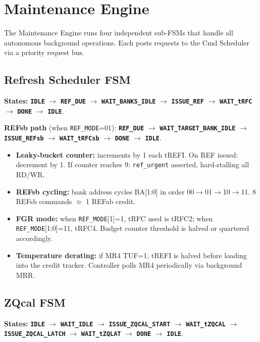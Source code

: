 \documentclass[11pt,a4paper]{article}
\newcommand{\reg}[1]{\textcolor{ddrpurple}{\texttt{#1}}}
\newcommand{\sig}[1]{\textcolor{ddrteal}{\texttt{#1}}}
\newcommand{\state}[1]{\textcolor{ddrblue}{\textbf{\texttt{#1}}}}
\begin{document}
\section{Maintenance Engine}

The Maintenance Engine runs four independent sub-FSMs that handle all
autonomous background operations. Each posts requests to the Cmd Scheduler
via a priority request bus.

\subsection{Refresh Scheduler FSM}

\textbf{States:} \state{IDLE} $\to$ \state{REF\_DUE} $\to$ \state{WAIT\_BANKS\_IDLE}
$\to$ \state{ISSUE\_REF} $\to$ \state{WAIT\_tRFC} $\to$ \state{DONE} $\to$
\state{IDLE}.

\textbf{REFsb path} (when \reg{REF\_MODE}=01): \state{REF\_DUE} $\to$
\state{WAIT\_TARGET\_BANK\_IDLE} $\to$ \state{ISSUE\_REFsb} $\to$
\state{WAIT\_tRFCsb} $\to$ \state{DONE} $\to$ \state{IDLE}.

\begin{itemize}[leftmargin=1.5em,itemsep=2pt]
  \item \textbf{Leaky-bucket counter:} increments by 1 each tREFI. On REF
        issued: decrement by 1. If counter reaches 9: \sig{ref\_urgent} asserted,
        hard-stalling all RD/WR.
  \item \textbf{REFsb cycling:} bank address cycles BA[1:0] in order 00$\to$01$\to$10$\to$11.
        8 REFsb commands $\approx$ 1 REFab credit.
  \item \textbf{FGR mode:} when \reg{REF\_MODE}[1]=1, tRFC used is tRFC2;
        when \reg{REF\_MODE}[1:0]=11, tRFC4. Budget counter threshold is
        halved or quartered accordingly.
  \item \textbf{Temperature derating:} if MR4 TUF=1, tREFI is halved before
        loading into the credit tracker. Controller polls MR4 periodically via
        background MRR.
\end{itemize}

\subsection{ZQcal FSM}

\textbf{States:} \state{IDLE} $\to$ \state{WAIT\_IDLE} $\to$
\state{ISSUE\_ZQCAL\_START} $\to$ \state{WAIT\_tZQCAL} $\to$
\state{ISSUE\_ZQCAL\_LATCH} $\to$ \state{WAIT\_tZQLAT} $\to$
\state{DONE} $\to$ \state{IDLE}.
\end{document}
